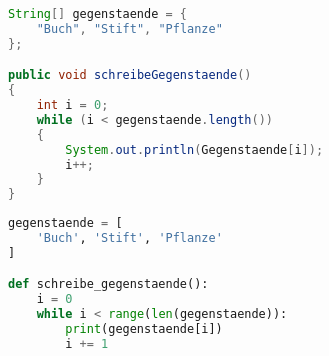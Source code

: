 \begin{lstlisting}[language=java,caption={while-Schleife Java},captionpos=b,label={lst:java:while}]
String[] gegenstaende = {
    "Buch", "Stift", "Pflanze"
};

public void schreibeGegenstaende()
{
    int i = 0;
    while (i < gegenstaende.length())
    {
        System.out.println(Gegenstaende[i]);
        i++;
    }
}
\end{lstlisting}

\begin{lstlisting}[language=python,caption={while-Schleife Python},captionpos=b,label={lst:python:while}]
gegenstaende = [
    'Buch', 'Stift', 'Pflanze'
]

def schreibe_gegenstaende():
    i = 0
    while i < range(len(gegenstaende)):
        print(gegenstaende[i])
        i += 1
\end{lstlisting}
